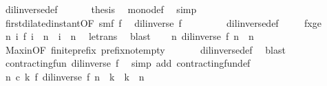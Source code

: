\begin{isabellebody}
\ dil{\isacharunderscore}inverse{\isacharunderscore}def\ \isacommand{{\isachardot}}\isamarkupfalse%
\isanewline
\ \ \isacommand{{\isacharbraceright}}\isamarkupfalse%
\ \isamarkupfalse%
\ {\isacharquery}thesis\ \isamarkupfalse%
\ mono{\isacharunderscore}def\ \isamarkupfalse%
\ simp\isanewline
\ \ \isamarkupfalse%
\isanewline
\isanewline
\ \ \isamarkupfalse%
\ first{\isacharunderscore}dilated{\isacharunderscore}instant{\isacharbrackleft}OF\ smf\ f{}{\isacharbrackright}\ \isamarkupfalse%
\ {}{\isacharcolon}{\isacartoucheopen}{\isacharparenleft}dil{\isacharunderscore}inverse\ f{\isacharparenright}\ {}\ {\isacharequal}\ {}{\isacartoucheclose}\isanewline
\ \ \ \ \isamarkupfalse%
\ dil{\isacharunderscore}inverse{\isacharunderscore}def\ \isacommand{{\isachardot}}\isamarkupfalse%
\isanewline
\isanewline
\ \ \isamarkupfalse%
\ fxge\ \isamarkupfalse%
\ {\isacartoucheopen}{\isasymforall}n\ i{\isachardot}\ f\ i\ {\isasymle}\ n\ {\isasymlongrightarrow}\ i\ {\isasymle}\ n{\isacartoucheclose}\ \isamarkupfalse%
\ le{\isacharunderscore}trans\ \isamarkupfalse%
\ blast\isanewline
\ \ \isamarkupfalse%
\ {}{\isacharcolon}{\isacartoucheopen}{\isasymforall}n{\isachardot}\ {\isacharparenleft}dil{\isacharunderscore}inverse\ f{\isacharparenright}\ n\ {\isasymle}\ n{\isacartoucheclose}\ \isamarkupfalse%
\ Max{\isacharunderscore}in{\isacharbrackleft}OF\ finite{\isacharunderscore}prefix\ prefix{\isacharunderscore}not{\isacharunderscore}empty{\isacharbrackright}\ \isanewline
\ \ \ \ \isamarkupfalse%
\ dil{\isacharunderscore}inverse{\isacharunderscore}def\ \isamarkupfalse%
\ blast\isanewline
\isanewline
\ \ \isamarkupfalse%
\ {}\ {}\ {}\ \isamarkupfalse%
\ {\isacharasterisk}{\isacharcolon}{\isacartoucheopen}contracting{\isacharunderscore}fun\ {\isacharparenleft}dil{\isacharunderscore}inverse\ f{\isacharparenright}{\isacartoucheclose}\ \isamarkupfalse%
\ {\isacharparenleft}simp\ add{\isacharcolon}\ contracting{\isacharunderscore}fun{\isacharunderscore}def{\isacharparenright}\isanewline
\isanewline
\ \ \isamarkupfalse%
\ {}{\isacharcolon}{\isacartoucheopen}{\isasymforall}n\ c\ k{\isachardot}\ f\ {\isacharparenleft}{\isacharparenleft}dil{\isacharunderscore}inverse\ f{\isacharparenright}\ n{\isacharparenright}\ {\isacharless}\ k\ {\isasymand}\ k\ {\isasymle}\ n\isanewline

\end{isabellebody}
